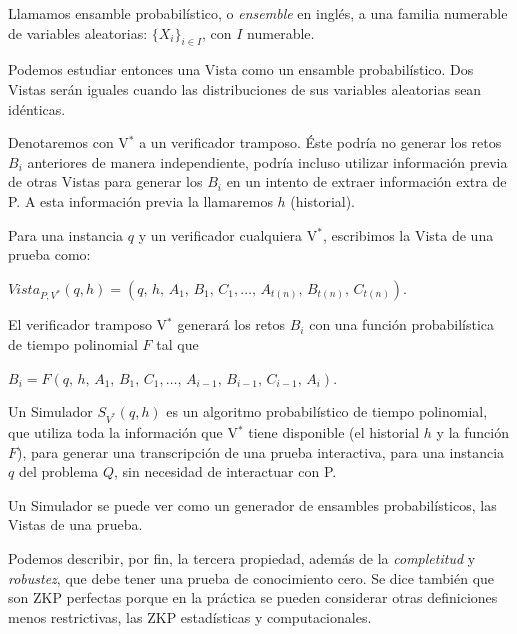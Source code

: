 \begin{definition}
	Llamamos ensamble probabilístico, o \textit{ensemble} en inglés, a una familia numerable de variables aleatorias: $\{X_i\}_{i\in I}$, con $I$ numerable.
\end{definition}

Podemos estudiar entonces una Vista como un ensamble probabilístico. Dos Vistas serán iguales cuando las distribuciones de sus variables aleatorias sean idénticas.


\hfil

Denotaremos con V$^*$ a un verificador tramposo. Éste podría no generar los retos $B_i$ anteriores de manera independiente, podría incluso utilizar información previa de otras Vistas para generar los $B_i$ en un intento de extraer información extra de P. A esta información previa la llamaremos $h$ (historial).

Para una instancia $q$ y un verificador cualquiera V$^*$, escribimos la Vista de una prueba como:

\begin{center}
	$Vista_{P,V^*}(q,h) = (q,\,h,\,A_1,\,B_1,\,C_1, \dots ,\,A_{t(n)},\,B_{t(n)},\,C_{t(n)})$.
\end{center}

El verificador tramposo V$^*$ generará los retos $B_i$ con una función probabilística de tiempo polinomial $F$ tal que

\begin{center}
	$B_i = F(q,\,h,\,A_1,\,B_1,\,C_1, \dots ,\,A_{i-1},\,B_{i-1},\,C_{i-1},\,A_i)$.
\end{center}



\begin{definition}
	Un Simulador $S_{V^*}(q,h)$ es un algoritmo probabilístico de tiempo polinomial, que utiliza toda la información que V$^*$ tiene disponible (el historial $h$ y la función $F$), para generar una transcripción de una prueba interactiva, para una instancia $q$ del problema $Q$, sin necesidad de interactuar con P.
\end{definition}

Un Simulador se puede ver como un generador de ensambles probabilísticos, las Vistas de una prueba.


\hfil

Podemos describir, por fin, la tercera propiedad, además de la \textit{completitud} y \textit{robustez}, que debe tener una prueba de conocimiento cero. Se dice también que son ZKP perfectas porque en la práctica se pueden considerar otras definiciones menos restrictivas, las ZKP estadísticas y computacionales.


